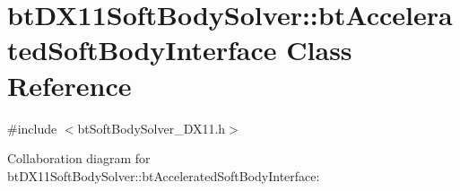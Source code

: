 \hypertarget{classbt_d_x11_soft_body_solver_1_1bt_accelerated_soft_body_interface}{\section{bt\+D\+X11\+Soft\+Body\+Solver\+:\+:bt\+Accelerated\+Soft\+Body\+Interface Class Reference}
\label{classbt_d_x11_soft_body_solver_1_1bt_accelerated_soft_body_interface}
}


{\ttfamily \#include $<$bt\+Soft\+Body\+Solver\+\_\+\+D\+X11.\+h$>$}



Collaboration diagram for bt\+D\+X11\+Soft\+Body\+Solver\+:\+:bt\+Accelerated\+Soft\+Body\+Interface\+:
